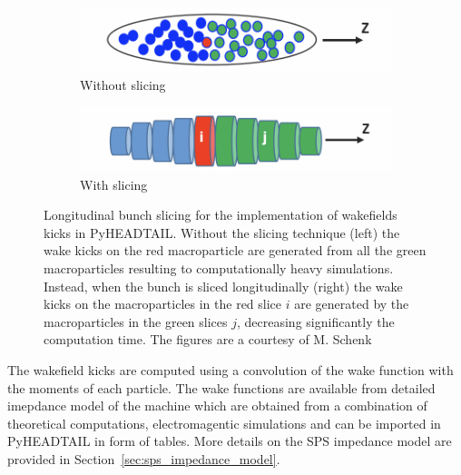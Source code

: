 {{\begin{enumerate}
    \begin{figure}[!ht]
        \centering
        \begin{subfigure}[t]{0.45\textwidth}
            \centering
            \includegraphics[width=1\textwidth]{images/Ch2/before_slicing.png}
            \caption{Without slicing}
        \end{subfigure}
        \hfill
        \begin{subfigure}[t]{0.45\textwidth}
            \centering
            \includegraphics[width=1\textwidth]{images/Ch2/after_slicing.png}
            \caption{With slicing}
        \end{subfigure}
        \hfill
         \caption{Longitudinal bunch slicing for the implementation of wakefields kicks in PyHEADTAIL. Without the slicing technique (left) the wake kicks on the red macroparticle are generated from all the green macroparticles resulting to computationally heavy simulations. Instead, when the bunch is sliced longitudinally (right) the wake kicks on the macroparticles in the red slice $i$ are generated by the macroparticles in the green slices $j$, decreasing significantly the computation time. The figures are a courtesy of M. Schenk~\cite{pyheadtail_schenk}} %
         \label{fig:longitudinal_slicing_wakefields}
     \end{figure}
        
    The wakefield kicks are computed using a convolution of the wake function with the moments of each particle. %
    The wake functions are available from detailed imepdance model of the machine which are obtained from a combination of theoretical computations, electromagentic simulations and can be imported in PyHEADTAIL in form of tables. More details on the SPS impedance model are provided in Section~\ref{sec:sps_impedance_model}.
    

\end{enumerate}}}
